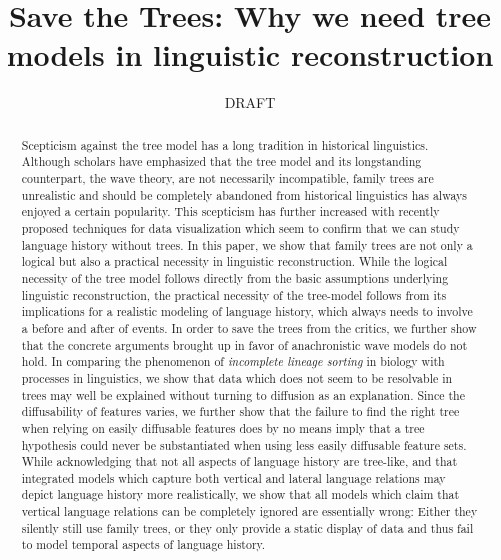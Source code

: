 \documentclass[svgnames,12pt]{scrartcl}
\title{Save the Trees: Why we need tree models in linguistic reconstruction}
\author{DRAFT}
\begin{document}
\maketitle
\begin{abstract}
  \small
Scepticism against the tree model has a long tradition in historical linguistics.  Although scholars
have emphasized that the tree model and its longstanding counterpart, the wave theory, are not
necessarily incompatible, family trees are unrealistic and should be completely abandoned from
historical linguistics has always enjoyed a certain popularity. This scepticism has further
increased with recently proposed techniques for data visualization which seem to confirm that we can 
study language history without trees.  In this paper, we show that family trees are not only a
logical but also a practical necessity in linguistic reconstruction. While the logical necessity of
the tree model follows directly from the basic assumptions underlying linguistic reconstruction, the
practical necessity of the tree-model follows from its implications for a realistic modeling of
language history, which always needs to involve a before and after of events.  In order to save the
trees from the critics, we further show that the concrete arguments brought up in favor of
anachronistic wave models do not hold. In comparing the phenomenon of \emph{incomplete lineage
sorting} in biology with processes in linguistics, we show that data which does not seem to be
resolvable in trees may well be explained without turning to diffusion as an explanation.  
Since the diffusability of features varies, we further show that the failure to find the right tree
when relying on easily diffusable features does by no means imply that a tree hypothesis could never
be substantiated when using less easily diffusable feature sets.  While acknowledging that not all
aspects of language history are tree-like, and that integrated models which capture both vertical
and lateral language relations may depict language history more realistically, we show that all
models which claim that vertical language relations can be completely ignored are essentially wrong:
Either they silently still use family trees, or they only provide a static display of data and thus
fail to model temporal aspects of language history.
\end{abstract}
\end{document}
